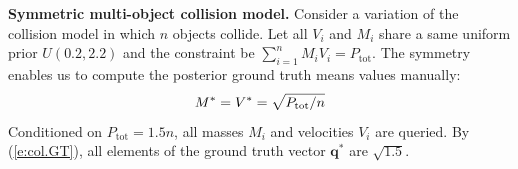 \documentclass[]{article}
\newcommand{\bvec}[1]{\textbf{#1}}
\begin{document}
{\bf Symmetric multi-object collision model.} %
Consider a variation of the collision model in which $n$ objects collide.  
Let all $V_i$ and $M_i$ share a same uniform prior $U(0.2, 2.2)$ and the constraint be $\sum_{i=1}^n{M_i V_i} = P_{\text{tot}}$. 
The symmetry enables us to compute the posterior ground truth means  values  manually:
\begin{equation}\footnotesize
\label{e:col.GT}
M^* = V^* = \sqrt{P_{\text{tot}} / n} %
\end{equation}
Conditioned on $P_{\text{tot}} = 1.5 n$, all masses $M_i$ and velocities  $V_i$ are queried. 
By (\ref{e:col.GT}), all elements of the ground truth vector $\bvec{q}^*$ are $\sqrt{1.5}$.
\end{document}
